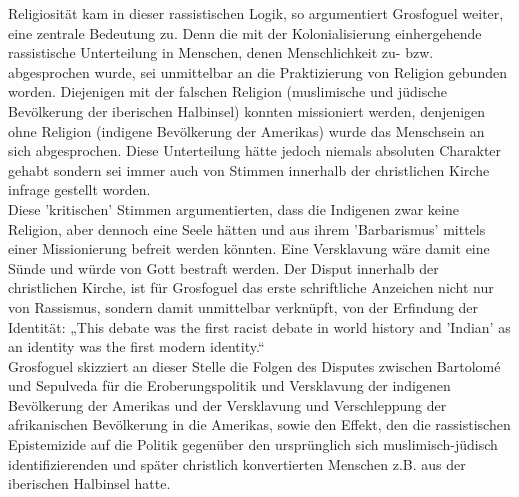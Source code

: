 \noindent Religiosität kam in dieser rassistischen Logik, so argumentiert Grosfoguel
weiter, eine zentrale Bedeutung zu. Denn die mit der Kolonialisierung
einhergehende rassistische Unterteilung in Menschen, denen Menschlichkeit zu-
bzw. abgesprochen wurde, sei unmittelbar an die Praktizierung von Religion
gebunden worden. Diejenigen mit der falschen Religion (muslimische und jüdische
Bevölkerung der iberischen Halbinsel) konnten missioniert werden, denjenigen
ohne Religion (indigene Bevölkerung der Amerikas) wurde das Menschsein an sich
abgesprochen.\footnotemark {} 
Diese Unterteilung hätte jedoch niemals absoluten Charakter
gehabt sondern sei immer auch von Stimmen innerhalb der christlichen Kirche
infrage gestellt worden.\\
Diese 'kritischen' Stimmen argumentierten, dass die Indigenen zwar keine
Religion, aber dennoch eine Seele hätten und aus ihrem 'Barbarismus' mittels
einer Missionierung befreit werden könnten.\footnotemark {}
Eine Versklavung wäre damit eine
Sünde und würde von Gott bestraft werden. Der Disput innerhalb der christlichen
Kirche, ist für Grosfoguel das erste schriftliche Anzeichen nicht nur von
Rassismus, sondern damit unmittelbar verknüpft, von der Erfindung der
Identität: „This debate was the first racist debate in world history and
'Indian' as an identity was the first modern identity.“\footnotemark
{} \\
Grosfoguel skizziert an dieser Stelle
die Folgen des Disputes zwischen Bartolomé und Sepulveda für die
Eroberungspolitik und Versklavung der indigenen Bevölkerung der Amerikas und
der Versklavung und Verschleppung der afrikanischen Bevölkerung in die
Amerikas, sowie den Effekt, den die rassistischen Epistemizide auf die Politik
gegenüber den ursprünglich sich muslimisch-jüdisch identifizierenden und später
christlich konvertierten Menschen z.B. aus der iberischen Halbinsel
hatte.\footnotemark {} \\

